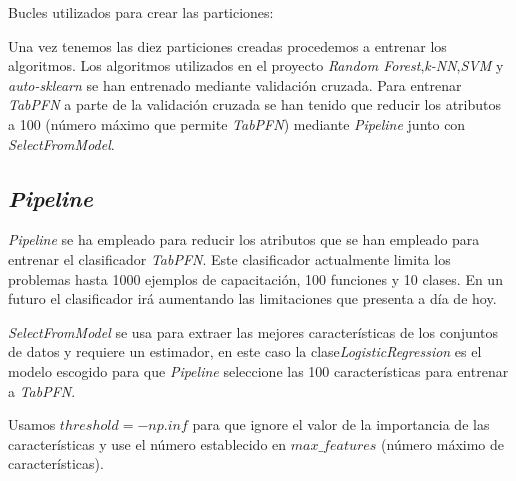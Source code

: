 Bucles utilizados para crear las particiones:



Una vez tenemos las diez particiones creadas procedemos a entrenar los algoritmos.
Los algoritmos utilizados en el proyecto \textit{Random Forest},\textit{k-NN},\textit{SVM} y \textit{auto-sklearn} se han entrenado mediante validación cruzada. Para entrenar \textit{TabPFN} a parte de la validación cruzada se han tenido que reducir los atributos a 100 (número máximo que permite \textit{TabPFN})  mediante \textit{Pipeline} junto con \textit{SelectFromModel}.


\subsection{\textit{Pipeline}}

\textit{Pipeline} se ha empleado para reducir los atributos que se han empleado para entrenar el clasificador \textit{TabPFN}. Este clasificador actualmente limita los problemas hasta 1000 ejemplos de capacitación, 100 funciones y 10 clases. En un futuro el clasificador irá aumentando las limitaciones que presenta a día de hoy. 

\textit{SelectFromModel} se usa para extraer las mejores características de los conjuntos de datos y requiere un estimador, en este caso la clase\textit{LogisticRegression} es el modelo escogido para que \textit{Pipeline} seleccione las 100 características para entrenar a \textit{TabPFN}.


Usamos $threshold=-np.inf$ para que ignore el valor de la importancia de las características y use el número establecido en $max\_features$ (número máximo de características).